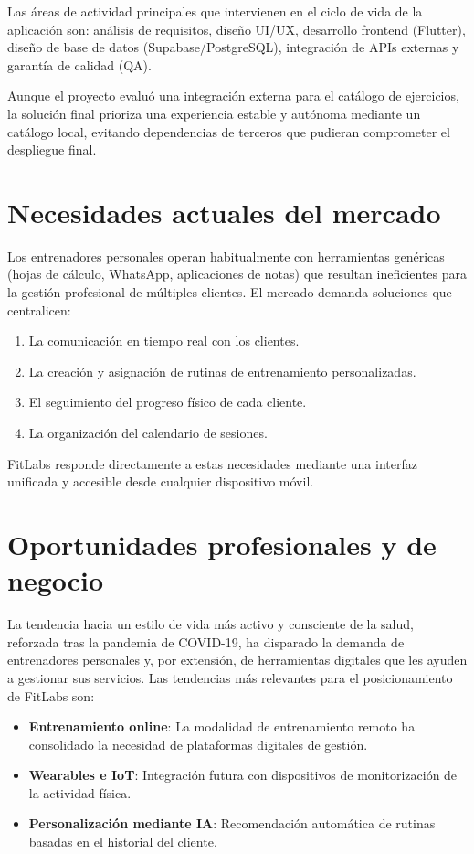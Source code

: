 Las áreas de actividad principales que intervienen en el ciclo de vida de la aplicación son: análisis de requisitos, diseño UI/UX, desarrollo frontend (Flutter), diseño de base de datos (Supabase/PostgreSQL), integración de APIs externas y garantía de calidad (QA).

Aunque el proyecto evaluó una integración externa para el catálogo de ejercicios, la solución final prioriza una experiencia estable y autónoma mediante un catálogo local, evitando dependencias de terceros que pudieran comprometer el despliegue final.

\section{Necesidades actuales del mercado}

Los entrenadores personales operan habitualmente con herramientas genéricas (hojas de cálculo, WhatsApp, aplicaciones de notas) que resultan ineficientes para la gestión profesional de múltiples clientes. El mercado demanda soluciones que centralicen:

\begin{enumerate}
  \item La comunicación en tiempo real con los clientes.
  \item La creación y asignación de rutinas de entrenamiento personalizadas.
  \item El seguimiento del progreso físico de cada cliente.
  \item La organización del calendario de sesiones.
\end{enumerate}

FitLabs responde directamente a estas necesidades mediante una interfaz unificada y accesible desde cualquier dispositivo móvil.

\section{Oportunidades profesionales y de negocio}

La tendencia hacia un estilo de vida más activo y consciente de la salud, reforzada tras la pandemia de COVID-19, ha disparado la demanda de entrenadores personales y, por extensión, de herramientas digitales que les ayuden a gestionar sus servicios. Las tendencias más relevantes para el posicionamiento de FitLabs son:

\begin{itemize}
  \item \textbf{Entrenamiento online}: La modalidad de entrenamiento remoto ha consolidado la necesidad de plataformas digitales de gestión.
  \item \textbf{Wearables e IoT}: Integración futura con dispositivos de monitorización de la actividad física.
  \item \textbf{Personalización mediante IA}: Recomendación automática de rutinas basadas en el historial del cliente.
\end{itemize}

